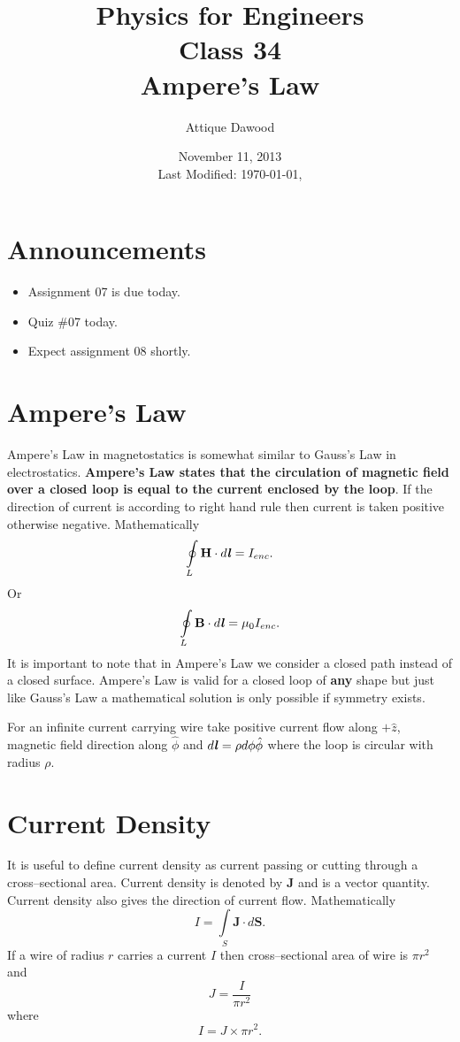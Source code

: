 \documentclass[12pt,a4paper]{article}
\title{\vspace{-3cm}Physics for Engineers\\Class 34\\Ampere's Law}
\author{Attique Dawood}
\date{November 11, 2013\\[0.2cm] Last Modified: \today, \currenttime}
\begin{document}
\maketitle
\section{Announcements}
\begin{itemize}
\item Assignment 07 is due today.
\item Quiz \#07 today.
\item Expect assignment 08 shortly.
\end{itemize}
\section{Ampere's Law}
Ampere's Law in magnetostatics is somewhat similar to Gauss's Law in electrostatics. \textbf{Ampere's Law states that the circulation of magnetic field over a closed loop is equal to the current enclosed by the loop}. If the direction of current is according to right hand rule then current is taken positive otherwise negative. Mathematically
\begin{equation}
\oint\limits_{L}\textbf{H}\cdot d\textbf{\textit{l}}=I_{enc}.
\end{equation}
Or
\begin{equation}
\oint\limits_{L}\textbf{B}\cdot d\textbf{\textit{l}}=\mu_0I_{enc}.
\end{equation}
It is important to note that in Ampere's Law we consider a closed path instead of a closed surface. Ampere's Law is valid for a closed loop of \textbf{any} shape but just like Gauss's Law a mathematical solution is only possible if symmetry exists.

For an infinite current carrying wire take positive current flow along $+\hat z$, magnetic field direction along $\hat \phi$ and $d\textbf{\textit{l}}=\rho d\phi\hat\phi$ where the loop is circular with radius $\rho$.
\section{Current Density}
It is useful to define current density as current passing or cutting through a cross--sectional area. Current density is denoted by \textbf{J} and is a vector quantity. Current density also gives the direction of current flow. Mathematically
\begin{equation}
I=\int\limits_{S}\textbf{J}\cdot d{\textbf{S}}.
\end{equation}
If a wire of radius $r$ carries a current $I$ then cross--sectional area of wire is $\pi r^2$ and
\begin{equation}
J=\dfrac{I}{\pi r^2}
\end{equation}
where
\begin{equation}
I=J\times\pi r^2.
\end{equation}
\newpage
\end{document}
